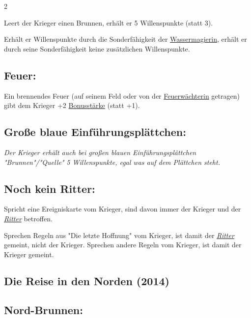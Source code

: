 \documentclass[10pt, a4paper, oneside]{book}
\newcommand{\fan}[1]{\textit{#1}}
\begin{document}
\begin{multicols*}{2}
\begin{nobgcolor}
Leert der Krieger einen Brunnen, erhält er 5 Willenspunkte (statt 3).

Erhält er Willenspunkte durch die Sonderfähigkeit der \hyperref[Wassermagierin]{Wassermagierin}, erhält er durch seine Sonderfähigkeit keine zusätzlichen Willenspunkte.


\subsection{Feuer:}

Ein brennendes Feuer (auf seinem Feld oder von der \hyperref[Feuerwächterin]{Feuerwächterin} getragen) gibt dem Krieger +2 \hyperref[Bonusstärke]{Bonusstärke} (statt +1).
\supercite{DeK:Begleitheft}



\subsection{Große blaue Einführungsplättchen:}

\fan{Der Krieger erhält auch bei großen blauen Einführungsplättchen "Brunnen"/"Quelle" 5 Willenspunkte, egal was auf dem Plättchen steht.}





\subsection{Noch kein Ritter:}

Spricht eine Ereigniskarte vom Krieger, sind davon immer der Krieger und der \hyperref[Ritter]{\fan{Ritter}} betroffen.

Sprechen Regeln aus "Die letzte Hoffnung" vom Krieger, ist damit der \hyperref[Ritter]{\fan{Ritter}} gemeint, nicht der Krieger. Sprechen andere Regeln vom Krieger, ist damit der Krieger gemeint.




\end{nobgcolor}

\begin{bgcolor}
\section{Die Reise in den Norden (2014)}


\subsection{Nord-Brunnen:}


\end{bgcolor}
\end{multicols*}
\end{document}
